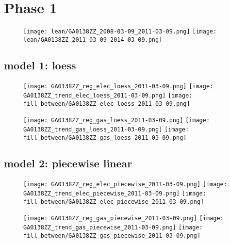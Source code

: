 \documentclass{article}
\begin{document}
\section{Phase 1}
\begin{figure}
  \centering
  \texttt{[image: lean/GA0138ZZ\_2008-03-09\_2011-03-09.png]}
  \texttt{[image: lean/GA0138ZZ\_2011-03-09\_2014-03-09.png]}
\end{figure}
\pagebreak
\subsection{model 1: loess}
\begin{figure}
  \centering
  \texttt{[image: GA0138ZZ\_reg\_elec\_loess\_2011-03-09.png]}
  \texttt{[image: GA0138ZZ\_trend\_elec\_loess\_2011-03-09.png]}
  \texttt{[image: fill\_between/GA0138ZZ\_elec\_loess\_2011-03-09.png]}
\end{figure}
\pagebreak
\FloatBarrier
\begin{figure}
  \centering
  \texttt{[image: GA0138ZZ\_reg\_gas\_loess\_2011-03-09.png]}
  \texttt{[image: GA0138ZZ\_trend\_gas\_loess\_2011-03-09.png]}
  \texttt{[image: fill\_between/GA0138ZZ\_gas\_loess\_2011-03-09.png]}
\end{figure}
\pagebreak
\subsection{model 2: piecewise linear}
\begin{figure}
  \centering
  \texttt{[image: GA0138ZZ\_reg\_elec\_piecewise\_2011-03-09.png]}
  \texttt{[image: GA0138ZZ\_trend\_elec\_piecewise\_2011-03-09.png]}
  \texttt{[image: fill\_between/GA0138ZZ\_elec\_piecewise\_2011-03-09.png]}
\end{figure}
\pagebreak
\begin{figure}
  \centering
  \texttt{[image: GA0138ZZ\_reg\_gas\_piecewise\_2011-03-09.png]}
  \texttt{[image: GA0138ZZ\_trend\_gas\_piecewise\_2011-03-09.png]}
  \texttt{[image: fill\_between/GA0138ZZ\_gas\_piecewise\_2011-03-09.png]}
\end{figure}
\pagebreak
\end{document}
